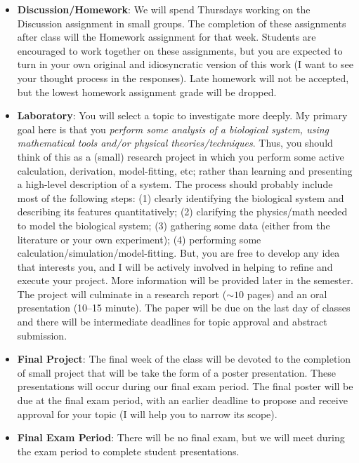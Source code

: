 \documentclass{article}
\begin{document}
\begin{itemize}
\item[] {\bf Discussion/Homework}:  We will spend Thursdays working on the Discussion assignment in small groups.  The completion of these assignments after class will the Homework assignment for that week.  Students are encouraged to work together on these assignments, but you are expected to turn in your own original and idiosyncratic version of this work (I want to see your thought process in the responses). Late homework will not be accepted, but the lowest homework assignment grade will be dropped.

\thispagestyle{empty}
\newpage

\item[] {\bf Laboratory}: You will select a topic to investigate more deeply.  My primary goal here is that you {\em perform some analysis of a biological system, using mathematical tools and/or physical theories/techniques}. Thus, you should think of this as a (small) research project in which you perform some active calculation, derivation, model-fitting, etc; rather than learning and presenting a high-level description of a system. The process should probably include most of the following steps: (1) clearly identifying the biological system and describing its features quantitatively; (2) clarifying the physics/math needed to model the biological system; (3) gathering some data (either from the literature or your own experiment); (4)  performing some calculation/simulation/model-fitting. But, you are free to develop any idea that interests you, and I will be actively involved in helping to refine and execute your project. More information will be provided later in the semester. The project will culminate in a research report ($\sim10$ pages) and an oral presentation (10--15 minute). The paper will be due on the last day of classes and there will be intermediate deadlines for topic approval and abstract submission. 

\item[] {\bf Final Project}: The final week of the class will be devoted to the completion of small project that will be take the form of a poster presentation. These presentations will occur during our final exam period.  The final poster will be due at the final exam period, with an earlier deadline to propose and receive approval for your topic (I will help you to narrow its scope).

\item[] {\bf Final Exam Period}: There will be no final exam, but we will meet during the exam period to complete student presentations.



\end{itemize}
\end{document}
